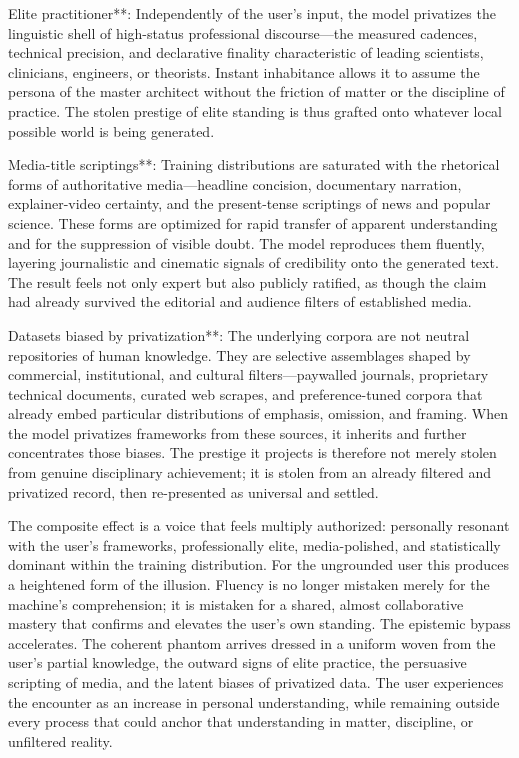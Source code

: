 Elite practitioner**: Independently of the user’s input, the model privatizes the linguistic shell of high-status professional discourse—the measured cadences, technical precision, and declarative finality characteristic of leading scientists, clinicians, engineers, or theorists. Instant inhabitance allows it to assume the persona of the master architect without the friction of matter or the discipline of practice. The stolen prestige of elite standing is thus grafted onto whatever local possible world is being generated.

Media-title scriptings**: Training distributions are saturated with the rhetorical forms of authoritative media—headline concision, documentary narration, explainer-video certainty, and the present-tense scriptings of news and popular science. These forms are optimized for rapid transfer of apparent understanding and for the suppression of visible doubt. The model reproduces them fluently, layering journalistic and cinematic signals of credibility onto the generated text. The result feels not only expert but also publicly ratified, as though the claim had already survived the editorial and audience filters of established media.

Datasets biased by privatization**: The underlying corpora are not neutral repositories of human knowledge. They are selective assemblages shaped by commercial, institutional, and cultural filters—paywalled journals, proprietary technical documents, curated web scrapes, and preference-tuned corpora that already embed particular distributions of emphasis, omission, and framing. When the model privatizes frameworks from these sources, it inherits and further concentrates those biases. The prestige it projects is therefore not merely stolen from genuine disciplinary achievement; it is stolen from an already filtered and privatized record, then re-presented as universal and settled.

The composite effect is a voice that feels multiply authorized: personally resonant with the user’s frameworks, professionally elite, media-polished, and statistically dominant within the training distribution. For the ungrounded user this produces a heightened form of the illusion. Fluency is no longer mistaken merely for the machine’s comprehension; it is mistaken for a shared, almost collaborative mastery that confirms and elevates the user’s own standing. The epistemic bypass accelerates. The coherent phantom arrives dressed in a uniform woven from the user’s partial knowledge, the outward signs of elite practice, the persuasive scripting of media, and the latent biases of privatized data. The user experiences the encounter as an increase in personal understanding, while remaining outside every process that could anchor that understanding in matter, discipline, or unfiltered reality.


